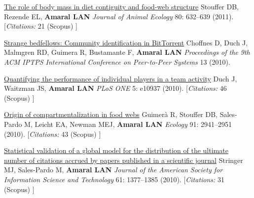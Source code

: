 \NumberedItem{\makebox[0.8cm][r]{[92]}}
\href{/people/amaral/role-body-mass-diet-contiguity-and-food-web-structure}
{The role of body mass in diet contiguity and food-web structure}
\newline
Stouffer DB, Rezende EL, {\textbf{Amaral LAN}}
\newline
\textit{Journal of  Animal Ecology}
    80:
632--639 (2011).
    [{\em{Citations:}}  21 (Scopus) ]
\newline
\Gap
~
\Gap

\NumberedItem{\makebox[0.8cm][r]{[91]}}
\href{/people/amaral/strange-bedfellows-community-identification-bittorrent}
{Strange bedfellows: Community identification in BitTorrent}
\newline
Choffnes D, Duch J, Malmgren RD, Guimera R, Bustamante F, {\textbf{Amaral LAN}}
\newline
\textit{Proceedings of the 9th ACM IPTPS International Conference on Peer-to-Peer Systems}
13 (2010).
\newline
\Gap
~
\Gap

\NumberedItem{\makebox[0.8cm][r]{[90]}}
\href{/people/amaral/quantifying-performance-individual-players-team-activity}
{Quantifying the performance of individual players in a team activity}
\newline
Duch J, Waitzman JS, {\textbf{Amaral LAN}}
\newline
\textit{PLoS ONE}
    5:
e10937 (2010).
    [{\em{Citations:}}  46 (Scopus) ]
\newline
\Gap
~
\Gap

\NumberedItem{\makebox[0.8cm][r]{[89]}}
\href{/people/amaral/origin-compartmentalization-food-webs}
{Origin of compartmentalization in food webs}
\newline
Guimer\`a R, Stouffer DB, Sales-Pardo M, Leicht EA, Newman MEJ, {\textbf{Amaral LAN}}
\newline
\textit{Ecology}
    91:
2941--2951 (2010).
    [{\em{Citations:}}  43 (Scopus) ]
\newline
\Gap
~
\Gap

\NumberedItem{\makebox[0.8cm][r]{[88]}}
\href{/people/amaral/statistical-validation-global-model-distribution-ultimate-number-citations-accrued-papers-published-scientific-journal}
{Statistical validation of a global model for the distribution of the ultimate number of citations accrued by papers published in a scientific journal}
\newline
Stringer MJ, Sales-Pardo M, {\textbf{Amaral LAN}}
\newline
\textit{Journal of the American Society for Information Science and Technology}
    61:
1377--1385 (2010).
    [{\em{Citations:}}  31 (Scopus) ]
\newline
\Gap
~
\Gap

